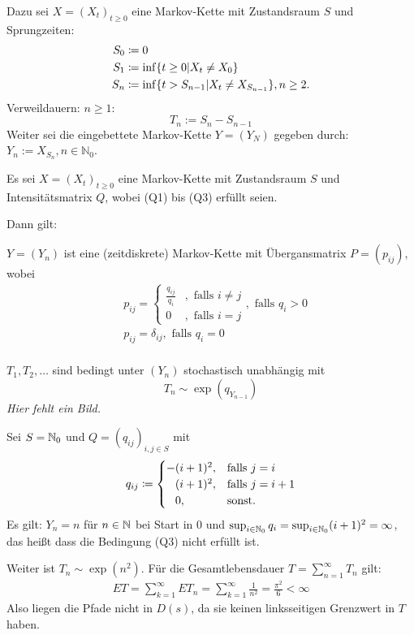 \documentclass[a4paper,twoside,DIV15,BCOR12mm]{scrbook}
\begin{document}
  Dazu sei $X=(X_t)_{t\geq 0}$ eine Markov-Kette mit Zustandsraum $S$ und Sprungzeiten: 
  \begin{align*}
    S_0&\da0 \\
    S_1&\da\inf\{t\geq0\vert X_t\neq X_0\} \\
    S_n&\da\inf\{t>S_{n-1}\vert X_t\neq X_{S_{n-1}} \}, n\geq 2.
  \end{align*}
  Verweildauern: $n\geq 1$:
  \[
  T_n:=S_n-S_{n-1}
  \]
  Weiter sei die eingebettete Markov-Kette $Y=(Y_N)$ gegeben durch: $Y_n:=X_{S_n}, n\in\mathbb N_0$.
  \begin{satz}
    \label{satz8.5}
    Es sei $X=(X_t)_{t\geq0}$ eine Markov-Kette mit Zustandsraum $S$ und Intensitätsmatrix $Q$, 
    wobei (Q1) bis (Q3) erfüllt seien.

    Dann gilt:
    \begin{enuma}
    \item $Y=(Y_n)$ ist eine (zeitdiskrete) Markov-Kette mit Übergansmatrix $P=(p_{ij})$, wobei
      \begin{align*}
	& p_{ij}=\begin{cases}
	\frac{q_{ij}}{q_i} & , \text{ falls } i\neq j \\
	0 & , \text{ falls } i=j
	\end{cases} , \text{ falls } q_i>0 \\
	& p_{ij}=\delta_{ij}, \text{ falls } q_i=0 \\
      \end{align*}
    \item $T_1,T_2,\dots$ sind bedingt unter $(Y_n)$ stochastisch unabhängig mit
      \[
      T_n\sim \exp(q_{Y_{n-1}})
      \]
      \emph{Hier fehlt ein Bild.}
    \end{enuma}
  \end{satz}

\begin{beispiel}
Sei $S=\mathbb{N}_0$ und $Q=(q_{ij})_{i,j\in S}$ mit
\begin{align*}
q_{ij} \da 
\begin{cases}
-(i+1)^2, & \text{falls } j=i \\
\phantom - (i+1)^2, & \text{falls } j=i+1 \\
\phantom - 0, &\text{sonst.}
\end{cases}
\end{align*}
Es gilt: $Y_n=n$ für $n\in\mathbb{N}$ bei Start in 0 und $\sup_{i\in\mathbb{N}_0} q_i = \sup_{i\in \mathbb{N}_0} (i+1)^2 = \infty$, das heißt dass die Bedingung (Q3) nicht erfüllt ist.

Weiter ist $T_n\sim \exp(n^2)$. Für die Gesamtlebensdauer $T=\sum_{n=1}^\infty T_n$ gilt:
\begin{align*}
ET = \sum_{k=1}^\infty  E T_n = \sum_{k=1}^\infty \frac1{n^2} = \frac {\pi^2}6 < \infty
\end{align*}
Also liegen die Pfade nicht in $D(s)$, da sie keinen linksseitigen Grenzwert in $T$ haben.
\end{beispiel}
\end{document}
